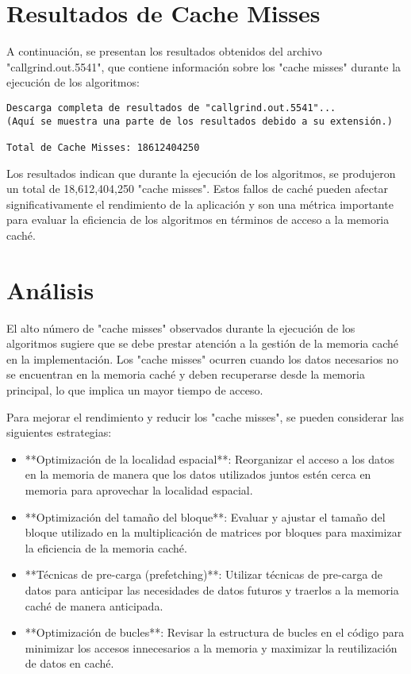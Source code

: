\section{Resultados de Cache Misses}
A continuación, se presentan los resultados obtenidos del archivo "callgrind.out.5541", que contiene información sobre los "cache misses" durante la ejecución de los algoritmos:

\begin{verbatim}
Descarga completa de resultados de "callgrind.out.5541"...
(Aquí se muestra una parte de los resultados debido a su extensión.)

Total de Cache Misses: 18612404250
\end{verbatim}

Los resultados indican que durante la ejecución de los algoritmos, se produjeron un total de 18,612,404,250 "cache misses". Estos fallos de caché pueden afectar significativamente el rendimiento de la aplicación y son una métrica importante para evaluar la eficiencia de los algoritmos en términos de acceso a la memoria caché.

\section{Análisis}
El alto número de "cache misses" observados durante la ejecución de los algoritmos sugiere que se debe prestar atención a la gestión de la memoria caché en la implementación. Los "cache misses" ocurren cuando los datos necesarios no se encuentran en la memoria caché y deben recuperarse desde la memoria principal, lo que implica un mayor tiempo de acceso.

Para mejorar el rendimiento y reducir los "cache misses", se pueden considerar las siguientes estrategias:

\begin{itemize}
    \item **Optimización de la localidad espacial**: Reorganizar el acceso a los datos en la memoria de manera que los datos utilizados juntos estén cerca en memoria para aprovechar la localidad espacial.
    
    \item **Optimización del tamaño del bloque**: Evaluar y ajustar el tamaño del bloque utilizado en la multiplicación de matrices por bloques para maximizar la eficiencia de la memoria caché.
    
    \item **Técnicas de pre-carga (prefetching)**: Utilizar técnicas de pre-carga de datos para anticipar las necesidades de datos futuros y traerlos a la memoria caché de manera anticipada.
    
    \item **Optimización de bucles**: Revisar la estructura de bucles en el código para minimizar los accesos innecesarios a la memoria y maximizar la reutilización de datos en caché.
\end{itemize}



